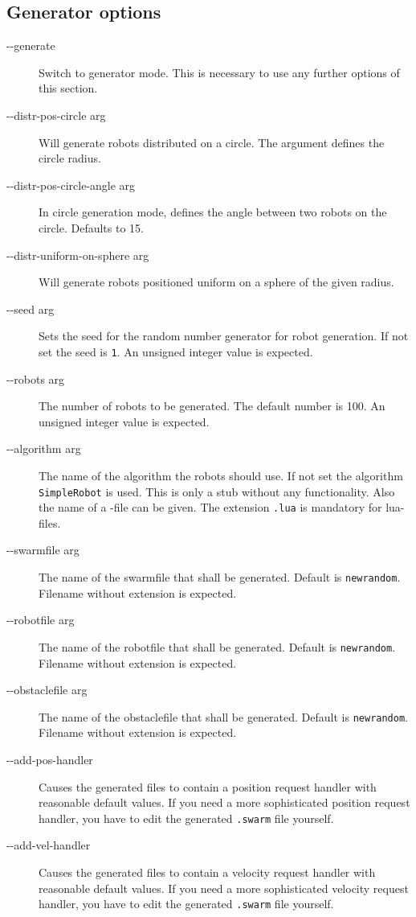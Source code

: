 \subsection{Generator options}
\begin{description}
	\item [-{}-generate] Switch to generator mode. This is necessary to use any further options of this section.
	\item [-{}-distr-pos-circle arg] Will generate robots distributed on a circle. The argument defines the circle radius.
	\item [-{}-distr-pos-circle-angle arg] In circle generation mode, defines the angle between two robots on the circle. Defaults to 15.
	\item [-{}-distr-uniform-on-sphere arg] Will generate robots positioned uniform on a sphere of the given radius.
	\item [-{}-seed arg] Sets the seed for the random number generator for robot generation. If not set the seed is {\tt 1}. An unsigned integer value is expected.
	\item [-{}-robots arg] The number of robots to be generated. The default number is 100. An unsigned integer value is expected.
	\item [-{}-algorithm arg] The name of the algorithm the robots should use. If not set the algorithm {\tt SimpleRobot} is used. This is only a stub without any functionality. Also the name of a \Lua-file can be given. The extension {\tt .lua} is mandatory for lua-files.
	\item [-{}-swarmfile arg] The name of the swarmfile that shall be generated. Default is {\tt newrandom}. Filename without extension is expected.
	\item [-{}-robotfile arg] The name of the robotfile that shall be generated. Default is {\tt newrandom}. Filename without extension is expected.
	\item [-{}-obstaclefile arg] The name of the obstaclefile that shall be generated. Default is {\tt newrandom}. Filename without extension is expected.
	\item [-{}-add-pos-handler] Causes the generated files to contain a position request handler with reasonable default values. If you need a more sophisticated position request handler, you have to edit the generated {\tt .swarm} file yourself.
	\item [-{}-add-vel-handler] Causes the generated files to contain a velocity request handler with reasonable default values. If you need a more sophisticated velocity request handler, you have to edit the generated {\tt .swarm} file yourself.

\end{description}
